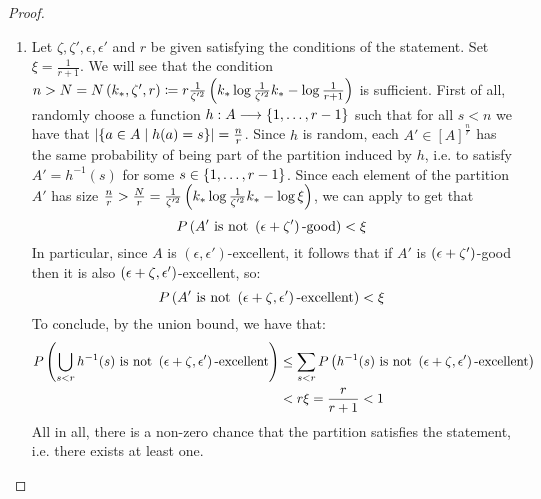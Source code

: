 \begin{lemma}[Claim 5.13]
\begin{proof}
\begin{enumerate}[label=(\alph*), ref=\alph*]
            \item Let $\zeta, \zeta', \epsilon, \epsilon'$ and $r$ be given satisfying the conditions of the statement.
                Set $\xi = \frac{1}{r + 1}$.
                We will see that the condition
                $n > N = N\left( k_{*}, \zeta', r \right) \coloneq r \frac{1}{\zeta'^2}\left( k_* \log{\frac{1}{\zeta'^2}k_*} - \log{\frac{1}{r + 1}} \right)$
                is sufficient.
                First of all, randomly choose a function $h: A \longrightarrow \left\{ 1, \dots, r-1 \right\}$ such that
                for all $s < n$ we have that $\left| \left\{ a \in A \mid h(a) = s \right\} \right| = \frac{n}{r}$.
                Since $h$ is random, each $A' \in [A]^\frac{n}{r}$ has the same probability of being part of the partition
                induced by $h$, i.e. to satisfy $A' = h^{-1}(s)$ for some $s \in \left\{ 1, \dots, r-1 \right\}$.
                Since each element of the partition $A'$ has size
                $\frac{n}{r} > \frac{N}{r} = \frac{1}{\zeta'^2}\left( k_* \log{\frac{1}{\zeta'^2}k_*} - \log{\xi} \right)$,
                we can apply  to get that
                \[
                    P\left( A' \text{ is not } \left( \epsilon + \zeta' \right)\text{-good} \right) < \xi
                \]
                In particular, since $A$ is $(\epsilon, \epsilon')$-excellent, it follows  that if $A'$ is
                $\left( \epsilon + \zeta' \right)$-good then it is also $\left( \epsilon + \zeta, \epsilon' \right)$-excellent, so:
                \[
                    P\left( A' \text{ is not } \left( \epsilon + \zeta, \epsilon' \right)\text{-excellent} \right) < \xi
                \]
                To conclude, by the union bound, we have that:
                \begin{align*}
                    P\left( \bigcup_{s < r} h^{-1}(s) \text{ is not } \left( \epsilon + \zeta, \epsilon' \right)\text{-excellent} \right)
                        & \leq \sum_{s < r} P\left( h^{-1}(s) \text{ is not } \left( \epsilon + \zeta, \epsilon' \right)\text{-excellent} \right) \\
                        & < r \xi = \frac{r}{r+1} < 1
                \end{align*}
                All in all, there is a non-zero chance that the partition satisfies the statement, i.e. there exists at least one.
        \end{enumerate}
        \end{proof}
    \end{lemma}

